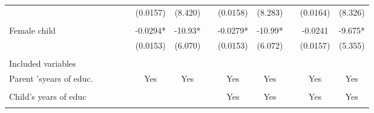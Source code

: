 \begin{tabular}{rrrrrrrrrrrrr}
          &           & \multicolumn{1}{c}{} & \multicolumn{1}{c}{} &           & \multicolumn{1}{c}{(0.0157)} & \multicolumn{1}{c}{(8.420)} &           & \multicolumn{1}{c}{(0.0158)} & \multicolumn{1}{c}{(8.283)} &           & \multicolumn{1}{c}{(0.0164)} & \multicolumn{1}{c}{(8.326)} \\
          &           &           &           &           &           &           &           &           &           &           &           &  \\
\multicolumn{1}{l}{Female child} &           & \multicolumn{1}{c}{} & \multicolumn{1}{c}{} &           & \multicolumn{1}{c}{-0.0294*} & \multicolumn{1}{c}{-10.93*} &           & \multicolumn{1}{c}{-0.0279*} & \multicolumn{1}{c}{-10.99*} &           & \multicolumn{1}{c}{-0.0241} & \multicolumn{1}{c}{-9.675*} \\
          &           & \multicolumn{1}{c}{} & \multicolumn{1}{c}{} &           & \multicolumn{1}{c}{(0.0153)} & \multicolumn{1}{c}{(6.070)} &           & \multicolumn{1}{c}{(0.0153)} & \multicolumn{1}{c}{(6.072)} &           & \multicolumn{1}{c}{(0.0157)} & \multicolumn{1}{c}{(5.355)} \\
          &           &           &           &           &           &           &           &           &           &           &           &  \\
\cmidrule{1-1}\cmidrule{3-4}\cmidrule{6-7}\cmidrule{9-10}\cmidrule{12-13}\multicolumn{1}{l}{Included variables} &           &           &           &           &           &           &           &           &           &           &           &  \\
\multicolumn{1}{l}{Parent 'syears of educ.} &           &           &           &           & \multicolumn{1}{c}{Yes} & \multicolumn{1}{c}{Yes} &           & \multicolumn{1}{c}{Yes} & \multicolumn{1}{c}{Yes} &           & \multicolumn{1}{c}{Yes} & \multicolumn{1}{c}{Yes} \\
          &           &           &           &           &           &           &           &           &           &           &           &  \\
\multicolumn{1}{l}{Child's years of educ} &           &           &           &           &           &           &           & \multicolumn{1}{c}{Yes} & \multicolumn{1}{c}{Yes} &           & \multicolumn{1}{c}{Yes} & \multicolumn{1}{c}{Yes} \\
          &           &           &           &           &           &           &           &           &           &           &           &  \\

\end{tabular}
